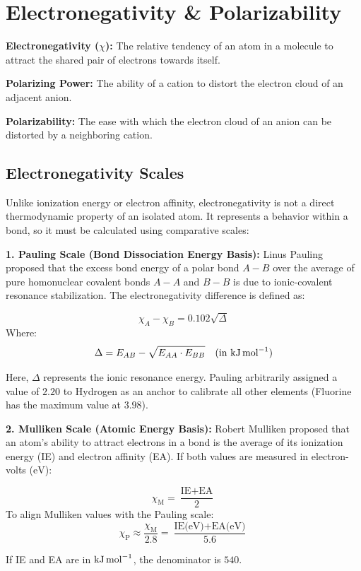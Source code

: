 \documentclass[12pt,a4paper]{article}
\begin{document}
\section{Electronegativity \& Polarizability}

\begin{tcolorbox}[defbox, title={Definitions: Electronegativity and Polarizability}]
  \textbf{Electronegativity ($\chi$):} The relative tendency of an atom in a molecule to attract the shared pair of electrons towards itself.
  \par\vspace{4pt}
  \textbf{Polarizing Power:} The ability of a cation to distort the electron cloud of an adjacent anion.
  \par\vspace{4pt}
  \textbf{Polarizability:} The ease with which the electron cloud of an anion can be distorted by a neighboring cation.
\end{tcolorbox}

\subsection{Electronegativity Scales}
Unlike ionization energy or electron affinity, electronegativity is not a direct thermodynamic property of an isolated atom. It represents a behavior within a bond, so it must be calculated using comparative scales:

\textbf{1. Pauling Scale (Bond Dissociation Energy Basis):}
Linus Pauling proposed that the excess bond energy of a polar bond $A-B$ over the average of pure homonuclear covalent bonds $A-A$ and $B-B$ is due to ionic-covalent resonance stabilization. The electronegativity difference is defined as:
\begin{tcolorbox}[formulabox, title={Pauling Electronegativity Difference}]
  \[ \chi_A - \chi_B = 0.102 \sqrt{\Delta} \]
  Where:
  \[ \Delta = E_{AB} - \sqrt{E_{AA} \cdot E_{BB}} \quad (\text{in kJ\,mol}^{-1}) \]
\end{tcolorbox}
Here, $\Delta$ represents the ionic resonance energy. Pauling arbitrarily assigned a value of $2.20$ to Hydrogen as an anchor to calibrate all other elements (Fluorine has the maximum value at $3.98$).

\textbf{2. Mulliken Scale (Atomic Energy Basis):}
Robert Mulliken proposed that an atom's ability to attract electrons in a bond is the average of its ionization energy (IE) and electron affinity (EA). If both values are measured in electron-volts ($\text{eV}$):
\begin{tcolorbox}[formulabox, title={Mulliken Electronegativity Equation}]
  \[ \chi_{\text{M}} = \frac{\text{IE} + \text{EA}}{2} \]
  To align Mulliken values with the Pauling scale:
  \[ \chi_{\text{P}} \approx \frac{\chi_{\text{M}}}{2.8} = \frac{\text{IE(eV)} + \text{EA(eV)}}{5.6} \]
\end{tcolorbox}
If IE and EA are in $\text{kJ\,mol}^{-1}$, the denominator is $540$.
\end{document}
